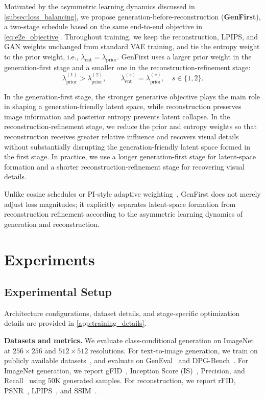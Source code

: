 \documentclass[]{bytedance_seed}
\begin{document}
Motivated by the asymmetric learning dynamics discussed in \cref{subsec:loss_balancing}, we propose generation-before-reconstruction (\textbf{GenFirst}), a two-stage schedule based on the same end-to-end objective in \cref{eq:e2e_objective}.
Throughout training, we keep the reconstruction, LPIPS, and GAN weights unchanged from standard VAE training, and tie the entropy weight to the prior weight, i.e., $\lambda_{\mathrm{ent}}=\lambda_{\mathrm{prior}}$.
GenFirst uses a larger prior weight in the generation-first stage and a smaller one in the reconstruction-refinement stage:
\begin{equation}
    \lambda_{\mathrm{prior}}^{(1)}
    >
    \lambda_{\mathrm{prior}}^{(2)},
    \qquad
    \lambda_{\mathrm{ent}}^{(s)}
    =
    \lambda_{\mathrm{prior}}^{(s)},
    \quad s\in\{1,2\}.
\end{equation}

In the generation-first stage, the stronger generative objective plays the main role in shaping a generation-friendly latent space, while reconstruction preserves image information and posterior entropy prevents latent collapse.
In the reconstruction-refinement stage, we reduce the prior and entropy weights so that reconstruction receives greater relative influence and recovers visual details without substantially disrupting the generation-friendly latent space formed in the first stage.
In practice, we use a longer generation-first stage for latent-space formation and a shorter reconstruction-refinement stage for recovering visual details.

Unlike cosine schedules or PI-style adaptive weighting~\cite{shao2020controlvae}, GenFirst does not merely adjust loss magnitudes; it explicitly separates latent-space formation from reconstruction refinement according to the asymmetric learning dynamics of generation and reconstruction.


\section{Experiments}
\label{sec:experiments}

\subsection{Experimental Setup}
\label{subsec:exp_setup}
Architecture configurations, dataset details, and stage-specific optimization details are provided in \cref{app:training_details}.

\textbf{Datasets and metrics.}
We evaluate class-conditional generation on ImageNet~\cite{imagenet} at $256\times256$ and $512\times512$ resolutions. 
For text-to-image generation, we train on publicly available datasets~\cite{JourneyDB,midjounery23m,megalith,imagenet,cc12m,commoncatalog,open4o}, and evaluate on GenEval~\cite{geneval} and DPG-Bench~\cite{dpg}.
For ImageNet generation, we report gFID~\cite{fid}, Inception Score (IS)~\cite{is}, Precision, and Recall~\cite{precision} using 50K generated samples. 
For reconstruction, we report rFID, PSNR~\cite{psnr}, LPIPS~\cite{lpips}, and SSIM~\cite{ssim}.
\end{document}
